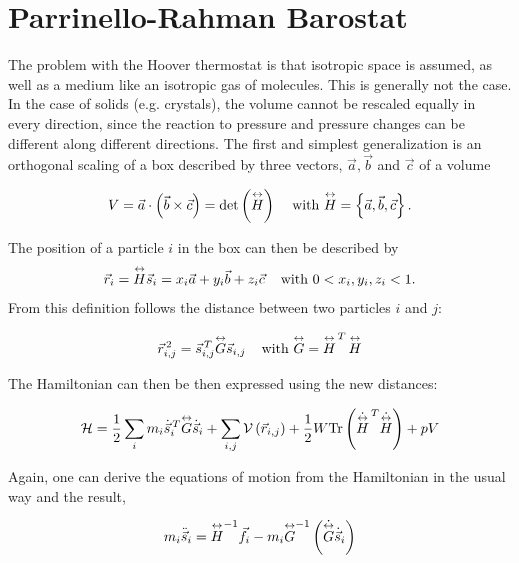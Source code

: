 \section{Parrinello-Rahman Barostat}

The problem with the Hoover thermostat is that isotropic space is assumed, as well as a medium like an isotropic gas of molecules. This is generally not the case. In the case of solids (e.g. crystals), the volume cannot be rescaled equally in every direction, since the reaction to pressure and pressure changes can be different along different directions. The first and simplest generalization is an orthogonal scaling of a box described by three vectors, $\vec{a}, \vec{b}$ and $\vec{c}$ of a volume


\begin{equation}
V= \vec{a}\cdot \left(\vec{b}\times\vec{c}\right) = \text{det}\left(\overset{\leftrightarrow}{H}\right)\hspace{0.4cm}\text{with }\overset{\leftrightarrow}{H} = \left\{\vec{a},\vec{b},\vec{c}\right\}.
\end{equation}


The position of a particle $i$ in the box can then be described by
\begin{equation}
\vec{r}_i = \overset{\leftrightarrow}{H} \vec{s}_i = x_i \vec{a} + y_i \vec{b} + z_i \vec{c} \hspace{0.4cm}\text{with }0<x_i,y_i,z_i<1.
\end{equation}
From this definition follows the distance between two particles $i$ and $j$:


\begin{equation}
\vec{r}_{i,j}^{\,2} =\vec{s}_{i,j}^{\,T} \overset{\leftrightarrow}{G} \vec{s}_{i,j}  \hspace{0.4cm}\text{with }\overset{\leftrightarrow}{G} = \overset{\leftrightarrow}{H}^{\,T}\, \overset{\leftrightarrow}{H}
\end{equation}

The Hamiltonian can then be then expressed using the new distances:

\begin{equation}
\mathcal{H} = \frac{1}{2} \sum_i m_i\dot{\vec{s}}_{i}^{\,T} \overset{\leftrightarrow}{G} \dot{\vec{s}}_{i} +  \sum_{i,j} \mathcal{V}\left(\vec{r}_{i,j}\right) + \frac{1}{2} W \text{Tr}\left( \dot{ \overset{\leftrightarrow}{H}} ^{\,T} \dot{\overset{\leftrightarrow}{H}}  \right) + pV
\end{equation}

Again, one can derive the equations of motion from the Hamiltonian in the usual way and the result,

\begin{equation}
m_i\ddot{\vec{s}}_i = \overset{\leftrightarrow}{H}^{-1} \vec{f}_i - m_i \overset{\leftrightarrow}{G}^{-1}\left(\dot{\overset{\leftrightarrow}{G}}\dot{\vec{s}}_i\right)
\end{equation}

